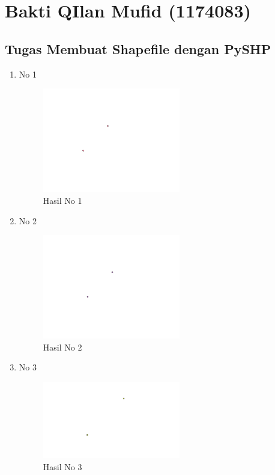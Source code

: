 \section{Bakti QIlan Mufid (1174083)}
\subsection{Tugas Membuat Shapefile dengan PySHP}
\begin{enumerate}
	\item No 1
	
	\begin{figure}[H]
		\includegraphics[width=6cm]{figures/Tugas2/1174083/1.png}
		\centering
		\caption{Hasil No 1}
	\end{figure}
	
	\item No 2
	
	\begin{figure}[H]
		\includegraphics[width=6cm]{figures/Tugas2/1174083/2.png}
		\centering
		\caption{Hasil No 2}
	\end{figure}

	\item No 3
	
	\begin{figure}[H]
		\includegraphics[width=6cm]{figures/Tugas2/1174083/3.png}
		\centering
		\caption{Hasil No 3}
	\end{figure}


\end{enumerate}
